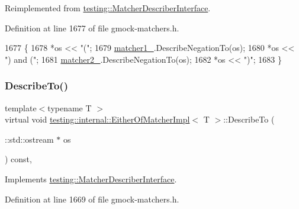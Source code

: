 Reimplemented from \hyperlink{classtesting_1_1MatcherDescriberInterface_a2071afbc47097c4d1c0064275af34db0}{testing\+::\+Matcher\+Describer\+Interface}.



Definition at line 1677 of file gmock-\/matchers.\+h.


\begin{DoxyCode}
1677                                                         \{
1678     *os << \textcolor{stringliteral}{"("};
1679     \hyperlink{classtesting_1_1internal_1_1EitherOfMatcherImpl_ae4ac9a56093a18b90168cc6f8a3be9d3}{matcher1\_}.DescribeNegationTo(os);
1680     *os << \textcolor{stringliteral}{") and ("};
1681     \hyperlink{classtesting_1_1internal_1_1EitherOfMatcherImpl_a73b3d0e53d7bca7ffb324d3a904eb62f}{matcher2\_}.DescribeNegationTo(os);
1682     *os << \textcolor{stringliteral}{")"};
1683   \}
\end{DoxyCode}
\mbox{\label{classtesting_1_1internal_1_1EitherOfMatcherImpl_a0389690d0ce06a1ca447db6281a380d3}} 
\subsubsection{\texorpdfstring{Describe\+To()}{DescribeTo()}}
{\footnotesize\ttfamily template$<$typename T $>$ \\
virtual void \hyperlink{classtesting_1_1internal_1_1EitherOfMatcherImpl}{testing\+::internal\+::\+Either\+Of\+Matcher\+Impl}$<$ T $>$\+::Describe\+To (\begin{DoxyParamCaption}\item[{\+::std\+::ostream $\ast$}]{os }\end{DoxyParamCaption}) const\hspace{0.3cm}{\ttfamily [inline]}, {\ttfamily [virtual]}}



Implements \hyperlink{classtesting_1_1MatcherDescriberInterface_ad9f861588bd969b6e3e717f13bb94e7b}{testing\+::\+Matcher\+Describer\+Interface}.



Definition at line 1669 of file gmock-\/matchers.\+h.


